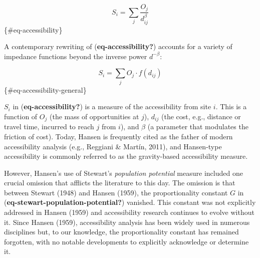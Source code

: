 \documentclass[
11pt, %
oneside, %
english, %
singlespacing, %
]{macthesis} %
\begin{document}
\[
S_{i} = \sum_j \frac{O_j }{d_{ij}^\beta}
\] \{\#eq-accessibility\}

A contemporary rewriting of (\textbf{eq-accessibility?}) accounts for a variety of impedance functions beyond the inverse power \(d^{-\beta}\):

\[
S_{i} = \sum_j O_j \cdot f(d_{ij})
\] \{\#eq-accessibility-general\}

\(S_{i}\) in (\textbf{eq-accessibility?}) is a measure of the accessibility from site \(i\). This is a function of \(O_j\) (the mass of opportunities at \(j\)), \(d_{ij}\) (the cost, e.g., distance or travel time, incurred to reach \(j\) from \(i\)), and \(\beta\) (a parameter that modulates the friction of cost). Today, Hansen is frequently cited as the father of modern accessibility analysis (e.g., Reggiani \& Martín, 2011), and Hansen-type accessibility is commonly referred to as the gravity-based accessibility measure.

However, Hansen's use of Stewart's \emph{population potential} measure included one crucial omission that afflicts the literature to this day. The omission is that between Stewart (1948) and Hansen (1959), the proportionality constant \(G\) in (\textbf{eq-stewart-population-potential?}) vanished. This constant was not explicitly addressed in Hansen (1959) and accessibility research continues to evolve without it. Since Hansen (1959), accessibility analysis has been widely used in numerous disciplines but, to our knowledge, the proportionality constant has remained forgotten, with no notable developments to explicitly acknowledge or determine it.
\end{document}
